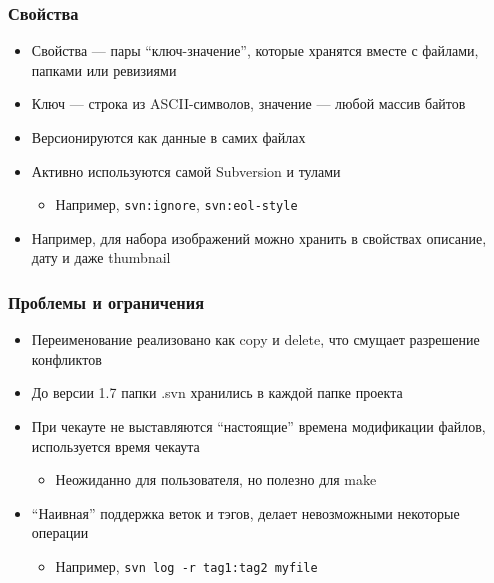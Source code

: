 \documentclass{../mcsslides}
\begin{document}
    \begin{frame}[fragile]
        \frametitle{Свойства}
        \begin{itemize}
            \item Свойства --- пары ``ключ-значение'', которые хранятся вместе с файлами, папками или ревизиями
            \item Ключ --- строка из ASCII-символов, значение --- любой массив байтов
            \item Версионируются как данные в самих файлах
            \item Активно используются самой Subversion и тулами
            \begin{itemize}
                \item Например, \verb|svn:ignore|, \verb|svn:eol-style|
            \end{itemize}
            \item Например, для набора изображений можно хранить в свойствах описание, дату и даже thumbnail
        \end{itemize}
    \end{frame}

    \begin{frame}[fragile]
        \frametitle{Проблемы и ограничения}
        \begin{itemize}
            \item Переименование реализовано как copy и delete, что смущает разрешение конфликтов
            \item До версии 1.7 папки .svn хранились в каждой папке проекта
            \item При чекауте не выставляются ``настоящие'' времена модификации файлов, используется время чекаута
            \begin{itemize}
                \item Неожиданно для пользователя, но полезно для make
            \end{itemize}
            \item ``Наивная'' поддержка веток и тэгов, делает невозможными некоторые операции
            \begin{itemize}
                \item Например, \verb|svn log -r tag1:tag2 myfile|
            \end{itemize}
        \end{itemize}
    \end{frame}
\end{document}

